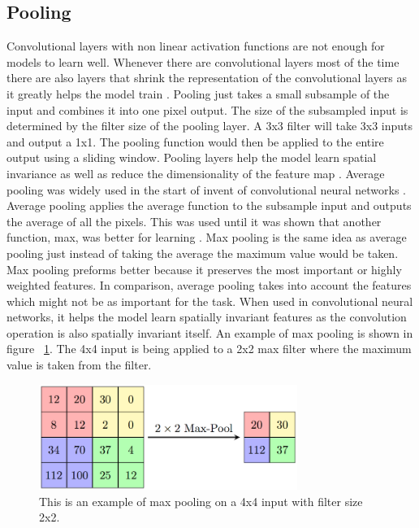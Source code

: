 \subsection{Pooling}
    Convolutional layers with non linear activation functions are not enough for models to learn well. 
    Whenever there are convolutional layers most of the time there are also layers that shrink the representation of the convolutional layers as it greatly helps the model train \cite{Lee:2011:ULH:2001269.2001295}. 
    Pooling just takes a small subsample of the input and combines it into one pixel output. 
    The size of the subsampled input is determined by the filter size of the pooling layer. 
    A 3x3 filter will take 3x3 inputs and output a 1x1. 
    The pooling function would then be applied to the entire output using a sliding window. 
    Pooling layers help the model learn spatial invariance as well as reduce the dimensionality of the feature map \cite{Scherer:2010:EPO:1886436.1886447}. 
    Average pooling was widely used in the start of invent of convolutional neural networks \cite{NIPS2012_Krizhevsky}. 
    Average pooling applies the average function to the subsample input and outputs the average of all the pixels. 
    This was used until it was shown that another function, max, was better for learning \cite{Scherer:2010:EPO:1886436.1886447}. 
    Max pooling is the same idea as average pooling just instead of taking the average the maximum value would be taken. 
    Max pooling preforms better because it preserves the most important or highly weighted features. 
    In comparison, average pooling takes into account the features which might not be as important for the task.
    When used in convolutional neural networks, it helps the model learn spatially invariant features as the convolution operation is also spatially invariant itself. 
    An example of max pooling is shown in figure ~\ref{fig_max_pool}. 
    The 4x4 input is being applied to a 2x2 max filter where the maximum value is taken from the filter. 

\begin{figure}[tbh]
\centering
\includegraphics[width=0.75\textwidth]{max_pooling.png}
\caption{ This is an example of max pooling on a 4x4 input with filter size 2x2.   }
\label{fig_max_pool}
\end{figure} 

